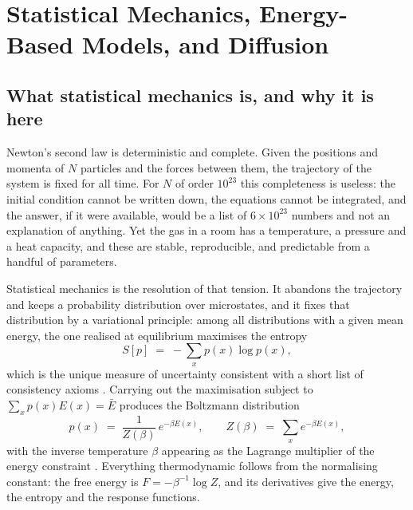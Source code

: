 %

\chapter{Statistical Mechanics, Energy-Based Models, and Diffusion}
\label{ch:statmech}

\section{What statistical mechanics is, and why it is here}
\label{sec:sm-what}

Newton's second law is deterministic and complete. Given the positions and
momenta of $N$ particles and the forces between them, the trajectory of the
system is fixed for all time. For $N$ of order $10^{23}$ this completeness is
useless: the initial condition cannot be written down, the equations cannot be
integrated, and the answer, if it were available, would be a list of
$6 \times 10^{23}$ numbers and not an explanation of anything. Yet the gas
in a room has a temperature, a pressure and a heat capacity, and these are
stable, reproducible, and predictable from a handful of parameters.

Statistical mechanics is the resolution of that tension. It abandons the
trajectory and keeps a probability distribution over microstates, and it fixes
that distribution by a variational principle: among all distributions with a
given mean energy, the one realised at equilibrium maximises the entropy
\begin{equation}
  S[p] \;=\; -\sum_{x} p(x) \log p(x),
  \label{eq:sm-entropy}
\end{equation}
which is the unique measure of uncertainty consistent with a short list of
consistency axioms \citep{jaynes1957information}. Carrying out the maximisation
subject to $\sum_x p(x) E(x) = \bar{E}$ produces the Boltzmann distribution
\begin{equation}
  p(x) \;=\; \frac{1}{Z(\beta)}\, e^{-\beta E(x)},
  \qquad
  Z(\beta) \;=\; \sum_{x} e^{-\beta E(x)},
  \label{eq:sm-boltzmann}
\end{equation}
with the inverse temperature $\beta$ appearing as the Lagrange multiplier of
the energy constraint \citep{landau1980statistical, goldstein2002classical}.
Everything thermodynamic follows from the normalising constant: the free energy
is $F = -\beta^{-1}\log Z$, and its derivatives give the energy, the entropy and
the response functions.

